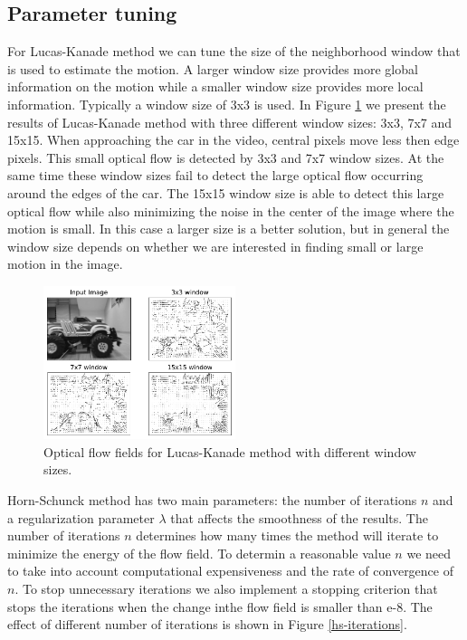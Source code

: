 \documentclass[9pt]{IEEEtran}
\begin{document}
\subsection*{Parameter tuning}
For Lucas-Kanade method we can tune the size of the neighborhood window that is used to estimate the motion.
A larger window size provides more global information on the motion while a smaller window size provides more local information.
Typically a window size of 3x3 is used. In Figure \ref{lk-window} we present the results of Lucas-Kanade method with three different window sizes: 3x3, 7x7 and 15x15.
When approaching the car in the video, central pixels move less then edge pixels.
This small optical flow is detected by 3x3 and 7x7 window sizes.
At the same time these window sizes fail to detect the large optical flow occurring around the edges of the car.
The 15x15 window size is able to detect this large optical flow while also minimizing the noise in the center of the image where the motion is small.
In this case a larger size is a better solution, but in general the window size depends on whether we are interested in finding small or large motion in the image.
\begin{figure}[H]
    \centering
    \includegraphics[width=0.5\textwidth]{LK_window.pdf}
    \vspace{-15px}
    \caption{Optical flow fields for Lucas-Kanade method with different window sizes.}
    \label{lk-window}
\end{figure}

Horn-Schunck method has two main parameters: the number of iterations $n$ and a regularization parameter $\lambda$ that affects the smoothness of the results.
The number of iterations $n$ determines how many times the method will iterate to minimize the energy of the flow field.
To determin a reasonable value $n$ we need to take into account computational expensiveness and the rate of convergence of $n$.
To stop unnecessary iterations we also implement a stopping criterion that stops the iterations when the change inthe flow field is smaller than e-8.
The effect of different number of iterations is shown in Figure \ref{hs-iterations}.
\end{document}
